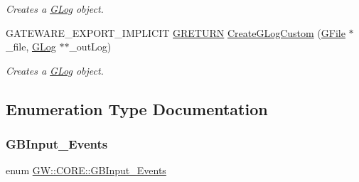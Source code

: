 \begin{DoxyCompactItemize}
\begin{DoxyCompactList}\small\item\em Creates a \hyperlink{class_g_w_1_1_c_o_r_e_1_1_g_log}{G\+Log} object. \end{DoxyCompactList}\item 
G\+A\+T\+E\+W\+A\+R\+E\+\_\+\+E\+X\+P\+O\+R\+T\+\_\+\+I\+M\+P\+L\+I\+C\+IT \hyperlink{namespace_g_w_a69b1aaebac1cac8049825f035884c95b}{G\+R\+E\+T\+U\+RN} \hyperlink{namespace_g_w_1_1_c_o_r_e_a2ef608a8d0b103f2501dea9999b80f93}{Create\+G\+Log\+Custom} (\hyperlink{class_g_w_1_1_c_o_r_e_1_1_g_file}{G\+File} $\ast$\+\_\+file, \hyperlink{class_g_w_1_1_c_o_r_e_1_1_g_log}{G\+Log} $\ast$$\ast$\+\_\+out\+Log)
\begin{DoxyCompactList}\small\item\em Creates a \hyperlink{class_g_w_1_1_c_o_r_e_1_1_g_log}{G\+Log} object. \end{DoxyCompactList}\end{DoxyCompactItemize}


\subsection{Enumeration Type Documentation}
\hypertarget{namespace_g_w_1_1_c_o_r_e_ad9b7ad6dcc306c2d2029ad1981f5dbe2}{}\label{namespace_g_w_1_1_c_o_r_e_ad9b7ad6dcc306c2d2029ad1981f5dbe2} 
\subsubsection{\texorpdfstring{G\+B\+Input\+\_\+\+Events}{GBInput\_Events}}
{\footnotesize\ttfamily enum \hyperlink{namespace_g_w_1_1_c_o_r_e_ad9b7ad6dcc306c2d2029ad1981f5dbe2}{G\+W\+::\+C\+O\+R\+E\+::\+G\+B\+Input\+\_\+\+Events}}


